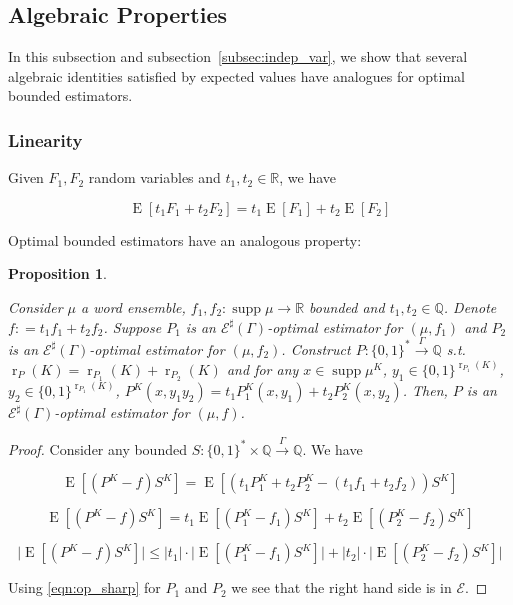 \documentclass{article}
\numberwithin{equation}{section}
\theoremstyle{definition}
\theoremstyle{plain}
\newtheorem{proposition}{Proposition}[section]
\newcommand{\Bool}{\{0,1\}}
\newcommand{\Words}{{\Bool^*}}
\newcommand{\WordsLen}[1]{{\Bool^{#1}}}
\DeclareMathOperator{\Supp}{supp}
\DeclareMathOperator{\E}{E}
\DeclareMathOperator{\R}{r}
\newcommand{\Rats}{\mathbb{Q}}
\newcommand{\Reals}{\mathbb{R}}
\newcommand{\Abs}[1]{\lvert #1 \rvert}
\newcommand{\Fall}{\mathcal{E}}
\newcommand{\ESG}{\Fall^\sharp(\Gamma)}
\newcommand{\Scheme}{\xrightarrow{\Gamma}}
\begin{document}
\subsection{Algebraic Properties}

In this subsection and subsection~\ref{subsec:indep_var}, we show that several algebraic identities satisfied by expected values have analogues for optimal bounded estimators.

\subsubsection{Linearity}

Given $F_1,F_2$ random variables and $t_1,t_2 \in \Reals$, we have 

\begin{equation}
\E[t_1 F_1 + t_2 F_2] = t_1 \E[F_1] + t_2 \E[F_2]
\end{equation}

Optimal bounded estimators have an analogous property:

\begin{proposition}
\label{prp:linearity}

Consider $\mu$ a word ensemble, $f_1,f_2: \Supp \mu \rightarrow \Reals$ bounded and $t_1,t_2 \in \Rats$. Denote $f: = t_1 f_1 + t_2 f_2$. Suppose $P_1$ is an $\ESG$-optimal estimator for $(\mu,f_1)$ and $P_2$ is an $\ESG$-optimal estimator for $(\mu,f_2)$. Construct $P: \Words \Scheme \Rats$ s.t. $\R_P(K) = \R_{P_1}(K) + \R_{P_2}(K)$ and for any $x \in \Supp \mu^{K}$, $y_1 \in \WordsLen{\R_{P_1}(K)}$, $y_2 \in \WordsLen{\R_{P_1}(K)}$, $P^{K}(x,y_1 y_2)=t_1 P_1^{K}(x,y_1) + t_2 P_2^{K}(x, y_2)$. Then, $P$ is an $\ESG$-optimal estimator for $(\mu, f)$.

\end{proposition}

\begin{proof}

Consider any bounded $S: \Words \times \Rats \Scheme \Rats$. We have

$$\E[(P^{K} - f)S^{K}] = \E[(t_1 P_1^{K} + t_2 P_2^{K} - (t_1 f_1 + t_2 f_2))S^{K}]$$

$$\E[(P^{K} - f)S^{K}] = t_1 \E[(P_1^{K} - f_1)S^{K}] + t_2 \E[(P_2^{K} - f_2)S^{K}]$$

$$\Abs{\E[(P^{K} - f)S^{K}]} \leq \Abs{t_1} \cdot \Abs{\E[(P_1^{K} - f_1)S^{K}]} + \Abs{t_2} \cdot \Abs{\E[(P_2^{K} - f_2)S^{K}]}$$

Using \ref{eqn:op_sharp} for $P_1$ and $P_2$ we see that the right hand side is in $\Fall$.
\end{proof}
\end{document}
